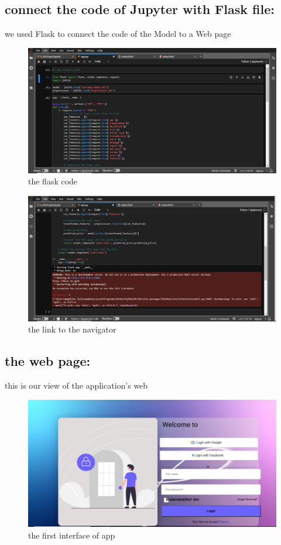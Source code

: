 \documentclass{article}
\begin{document}
\subsection{connect the code of Jupyter with Flask file:}
we used Flask to connect the code of the Model to a Web page
\begin{figure}[h]
    \centering
    \includegraphics[width=1\textwidth]{flask1.png}
    \caption{the flask code}
    \label{fig:my_label}
\end{figure}
\begin{figure}[h]
    \centering
    \includegraphics[width=1\textwidth]{flask2.png}
    \caption{the link to the navigator}
    \label{fig:my_label}
\end{figure}
\subsection{the web page:}
this is our view of the application's web 
\begin{figure}[h]
    \centering
    \includegraphics[width=1\textwidth]{input.png}
    \caption{the first interface of app}
    \label{fig:my_label}
\end{figure}
\end{document}

